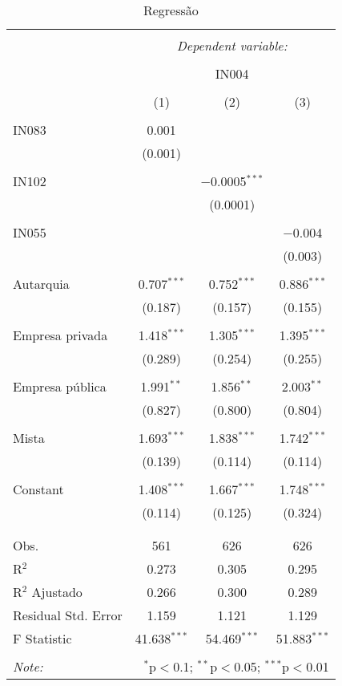 
\begin{table}[H] \centering 
  \caption{Regressão} 
  \label{} 
\begin{tabular}{@{\extracolsep{5pt}}lccc} 
\\[-1.8ex]\hline 
\hline \\[-1.8ex] 
 & \multicolumn{3}{c}{\textit{Dependent variable:}} \\ 
\cline{2-4} 
\\[-1.8ex] & \multicolumn{3}{c}{IN004} \\ 
\\[-1.8ex] & (1) & (2) & (3)\\ 
\hline \\[-1.8ex] 
 IN083 & 0.001 &  &  \\ 
  & (0.001) &  &  \\ 
  & & & \\ 
 IN102 &  & $-$0.0005$^{***}$ &  \\ 
  &  & (0.0001) &  \\ 
  & & & \\ 
 IN055 &  &  & $-$0.004 \\ 
  &  &  & (0.003) \\ 
  & & & \\ 
 Autarquia & 0.707$^{***}$ & 0.752$^{***}$ & 0.886$^{***}$ \\ 
  & (0.187) & (0.157) & (0.155) \\ 
  & & & \\ 
 Empresa privada & 1.418$^{***}$ & 1.305$^{***}$ & 1.395$^{***}$ \\ 
  & (0.289) & (0.254) & (0.255) \\ 
  & & & \\ 
 Empresa pública & 1.991$^{**}$ & 1.856$^{**}$ & 2.003$^{**}$ \\ 
  & (0.827) & (0.800) & (0.804) \\ 
  & & & \\ 
 Mista & 1.693$^{***}$ & 1.838$^{***}$ & 1.742$^{***}$ \\ 
  & (0.139) & (0.114) & (0.114) \\ 
  & & & \\ 
 Constant & 1.408$^{***}$ & 1.667$^{***}$ & 1.748$^{***}$ \\ 
  & (0.114) & (0.125) & (0.324) \\ 
  & & & \\ 
\hline \\[-1.8ex] 
Obs. & 561 & 626 & 626 \\ 
R$^{2}$ & 0.273 & 0.305 & 0.295 \\ 
R$^{2}$ Ajustado & 0.266 & 0.300 & 0.289 \\ 
Residual Std. Error & 1.159  & 1.121  & 1.129  \\ 
F Statistic & 41.638$^{***}$  & 54.469$^{***}$  & 51.883$^{***}$  \\ 
\hline 
\hline \\[-1.8ex] 
\textit{Note:}  & \multicolumn{3}{r}{$^{*}$p$<$0.1; $^{**}$p$<$0.05; $^{***}$p$<$0.01} \\ 
\end{tabular} 
\end{table} 